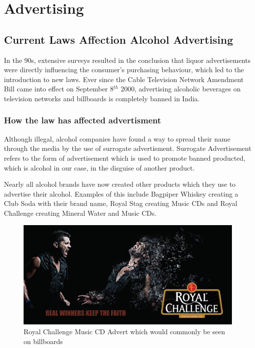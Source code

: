 \documentclass{article}
\begin{document}
\section{Advertising}
\subsection{Current Laws Affection Alcohol Advertising}
In the 90s, extensive surveys resulted in the conclusion that liquor advertisements
were directly influencing the consumer's purchasing behaviour, which led to the 
introduction to new laws. Ever since the Cable Television Network Amendment Bill 
came into effect on September 8$^{th}$ 2000, advertising alcoholic beverages on 
television networks and billboards is completely banned in India. 

\subsubsection{How the law has affected advertisment}
Although illegal, alcohol companies have found a way to spread their name through
the media by the use of surrogate advertisment. Surrogate Advertisement refers
to the form of advertisement which is used to promote banned producted, which is
alcohol in our case, in the disguise of another product. 

Nearly all alcohol brands have now created other products which they use to advertise
their alcohol. Examples of this include Bagpiper Whiskey creating a Club Soda with
their brand name, Royal Stag creating Music CDs and Royal Challenge creating Mineral
Water and Music CDs.

\begin{figure}[h!]
	\caption{Royal Challenge Music CD Advert which would commonly be seen on billboards}
	\centering
		\includegraphics[width=\textwidth]{rcad1.jpg}
\end{figure}
\end{document}
